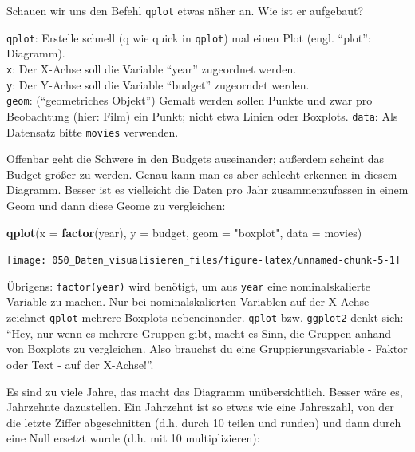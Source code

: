 \documentclass[12pt,ngerman,]{book}
\makeatletter
\newenvironment{Shaded}{\begin{snugshade}}{\end{snugshade}}
\newcommand{\KeywordTok}[1]{\textcolor[rgb]{0.13,0.29,0.53}{\textbf{#1}}}
\newcommand{\DataTypeTok}[1]{\textcolor[rgb]{0.13,0.29,0.53}{#1}}
\newcommand{\StringTok}[1]{\textcolor[rgb]{0.31,0.60,0.02}{#1}}
\newcommand{\NormalTok}[1]{#1}
\newenvironment{kframe}{%
\medskip{}
\setlength{\fboxsep}{.8em}
 \def\at@end@of@kframe{}%
 \ifinner\ifhmode%
  \def\at@end@of@kframe{\end{minipage}}%
  \begin{minipage}{\columnwidth}%
 \fi\fi%
 \def\FrameCommand##1{\hskip\@totalleftmargin \hskip-\fboxsep
 \colorbox{shadecolor}{##1}\hskip-\fboxsep
     \hskip-\linewidth \hskip-\@totalleftmargin \hskip\columnwidth}%
 \MakeFramed {\advance\hsize-\width
   \@totalleftmargin\z@ \linewidth\hsize
   \@setminipage}}%
 {\par\unskip\endMakeFramed%
 \at@end@of@kframe}
\renewenvironment{Shaded}{\begin{kframe}}{\end{kframe}}
\theoremstyle{definition}
\theoremstyle{definition}
\theoremstyle{remark}
\let\BeginKnitrBlock\begin \let\EndKnitrBlock\end
\makeatother
\begin{document}
Schauen wir uns den Befehl \texttt{qplot} etwas näher an. Wie ist er
aufgebaut?

\BeginKnitrBlock{rmdpseudocode}
\texttt{qplot}: Erstelle schnell (q wie quick in \texttt{qplot}) mal
einen Plot (engl. ``plot'': Diagramm).\\
\texttt{x}: Der X-Achse soll die Variable ``year'' zugeordnet werden.\\
\texttt{y}: Der Y-Achse soll die Variable ``budget'' zugeorndet
werden.\\
\texttt{geom}: (``geometriches Objekt'') Gemalt werden sollen Punkte und
zwar pro Beobachtung (hier: Film) ein Punkt; nicht etwa Linien oder
Boxplots. \texttt{data}: Als Datensatz bitte \texttt{movies} verwenden.
\EndKnitrBlock{rmdpseudocode}

Offenbar geht die Schwere in den Budgets auseinander; außerdem scheint
das Budget größer zu werden. Genau kann man es aber schlecht erkennen in
diesem Diagramm. Besser ist es vielleicht die Daten pro Jahr
zusammenzufassen in einem Geom und dann diese Geome zu vergleichen:

\begin{Shaded}
\begin{Highlighting}[]
\KeywordTok{qplot}\NormalTok{(}\DataTypeTok{x =} \KeywordTok{factor}\NormalTok{(year), }
      \DataTypeTok{y =}\NormalTok{ budget, }
      \DataTypeTok{geom =} \StringTok{"boxplot"}\NormalTok{, }
      \DataTypeTok{data =}\NormalTok{ movies)}
\end{Highlighting}
\end{Shaded}

\begin{center}\texttt{[image: 050\_Daten\_visualisieren\_files/figure-latex/unnamed-chunk-5-1]} \end{center}

Übrigens: \texttt{factor(year)} wird benötigt, um aus \texttt{year} eine
nominalskalierte Variable zu machen. Nur bei nominalskalierten Variablen
auf der X-Achse zeichnet \texttt{qplot} mehrere Boxplots nebeneinander.
\texttt{qplot} bzw. \texttt{ggplot2} denkt sich: ``Hey, nur wenn es
mehrere Gruppen gibt, macht es Sinn, die Gruppen anhand von Boxplots zu
vergleichen. Also brauchst du eine Gruppierungsvariable - Faktor oder
Text - auf der X-Achse!''.

Es sind zu viele Jahre, das macht das Diagramm unübersichtlich. Besser
wäre es, Jahrzehnte dazustellen. Ein Jahrzehnt ist so etwas wie eine
Jahreszahl, von der die letzte Ziffer abgeschnitten (d.h. durch 10
teilen und runden) und dann durch eine Null ersetzt wurde (d.h. mit 10
multiplizieren):
\end{document}

